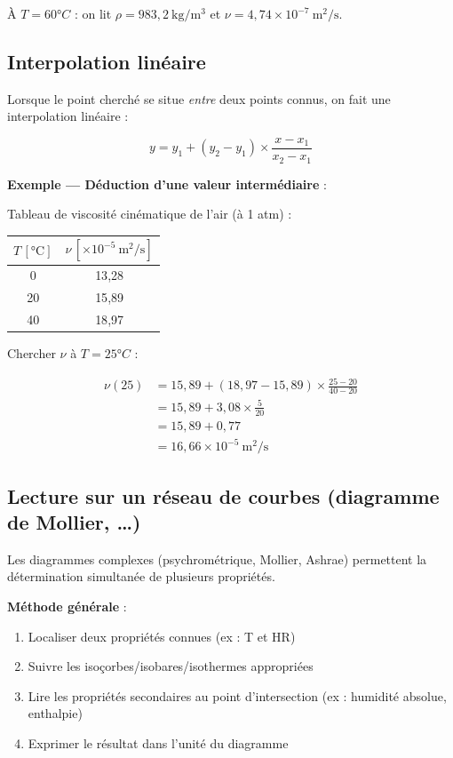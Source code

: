 À $T = 60°C$ : on lit $\rho = 983{,}2~\mathrm{kg/m^3}$ et $\nu = 4{,}74 \times
10^{-7}~\mathrm{m^2/s}$.

\subsection{Interpolation linéaire}

Lorsque le point cherché se situe \textit{entre} deux points connus, on fait une interpolation
linéaire :

\[
  y = y_1 + (y_2 - y_1) \times \frac{x - x_1}{x_2 - x_1}
\]

\textbf{Exemple — Déduction d'une valeur intermédiaire} :

Tableau de viscosité cinématique de l'air (à 1 atm) :

\begin{center}
  \sffamily
  \begin{tabular}{|c|c|}
    \hline
    $T\,[\mathrm{°C}]$ & $\nu\,[\times 10^{-5}~\mathrm{m^2/s}]$ \\
    \hline
    0 & 13{,}28 \\
    20 & 15{,}89 \\
    40 & 18{,}97 \\
    \hline
  \end{tabular}
\end{center}

Chercher $\nu$ à $T = 25°C$ :

\begin{align*}
  \nu(25) &= 15{,}89 + (18{,}97 - 15{,}89) \times \frac{25 - 20}{40 - 20} \\
  &= 15{,}89 + 3{,}08 \times \frac{5}{20} \\
  &= 15{,}89 + 0{,}77 \\
  &= 16{,}66 \times 10^{-5}~\mathrm{m^2/s}
\end{align*}

\subsection{Lecture sur un réseau de courbes (diagramme de Mollier, …)}

Les diagrammes complexes (psychrométrique, Mollier, Ashrae) permettent la détermination
simultanée de plusieurs propriétés.

\textbf{Méthode générale} :
\begin{enumerate}
  \item Localiser deux propriétés connues (ex : T et HR)
  \item Suivre les isoçorbes/isobares/isothermes appropriées
  \item Lire les propriétés secondaires au point d'intersection (ex : humidité absolue,
        enthalpie)
  \item Exprimer le résultat dans l'unité du diagramme
\end{enumerate}

